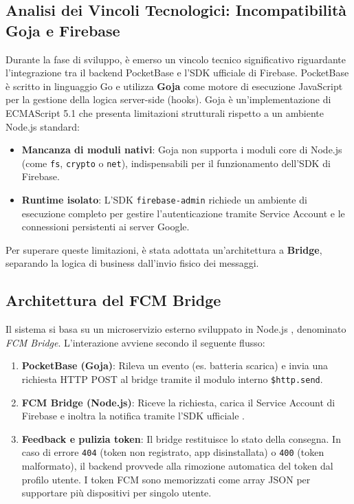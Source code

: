 \documentclass[12pt,a4paper]{article}
\begin{document}
\subsection{Analisi dei Vincoli Tecnologici: Incompatibilità Goja e Firebase}
Durante la fase di sviluppo, è emerso un vincolo tecnico significativo riguardante l'integrazione tra il backend PocketBase e l'SDK ufficiale di Firebase. 
PocketBase è scritto in linguaggio Go e utilizza \textbf{Goja} come motore di esecuzione JavaScript per la gestione della logica server-side (hooks). Goja è un'implementazione di ECMAScript 5.1 che presenta limitazioni strutturali rispetto a un ambiente Node.js \cite{nodejs} standard:
\begin{itemize}
    \item \textbf{Mancanza di moduli nativi}: Goja non supporta i moduli core di Node.js (come \texttt{fs}, \texttt{crypto} o \texttt{net}), indispensabili per il funzionamento dell'SDK di Firebase.
    \item \textbf{Runtime isolato}: L'SDK \texttt{firebase-admin} \cite{firebase_admin} richiede un ambiente di esecuzione completo per gestire l'autenticazione tramite Service Account e le connessioni persistenti ai server Google.
\end{itemize}
Per superare queste limitazioni, è stata adottata un'architettura a \textbf{Bridge}, separando la logica di business dall'invio fisico dei messaggi.
\subsection{Architettura del FCM Bridge}
Il sistema si basa su un microservizio esterno sviluppato in Node.js \cite{nodejs}, denominato \textit{FCM Bridge}. L'interazione avviene secondo il seguente flusso:
\begin{enumerate}
    \item \textbf{PocketBase (Goja)}: Rileva un evento (es. batteria scarica) e invia una richiesta HTTP POST al bridge tramite il modulo interno \texttt{\$http.send}.
    \item \textbf{FCM Bridge (Node.js)}: Riceve la richiesta, carica il Service Account di Firebase e inoltra la notifica tramite l'SDK ufficiale \cite{firebase_admin}.
    \item \textbf{Feedback e pulizia token}: Il bridge restituisce lo stato della consegna. In caso di errore \texttt{404} (token non registrato, app disinstallata) o \texttt{400} (token malformato), il backend provvede alla rimozione automatica del token dal profilo utente. I token FCM sono memorizzati come array JSON per supportare più dispositivi per singolo utente.
\end{enumerate}
\end{document}
